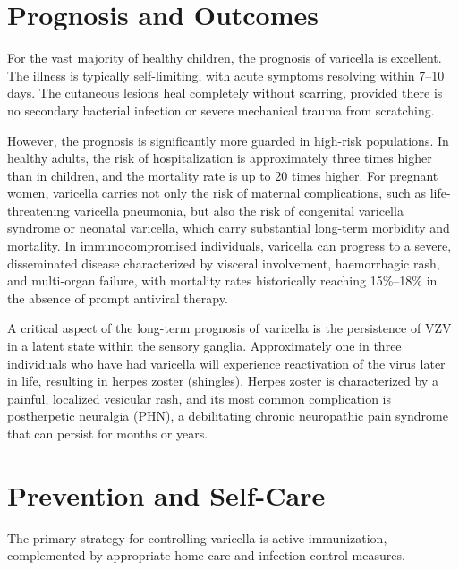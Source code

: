 \section*{Prognosis and Outcomes}
For the vast majority of healthy children, the prognosis of varicella is excellent. The illness is typically self-limiting, with acute symptoms resolving within 7--10 days. The cutaneous lesions heal completely without scarring, provided there is no secondary bacterial infection or severe mechanical trauma from scratching.

However, the prognosis is significantly more guarded in high-risk populations. In healthy adults, the risk of hospitalization is approximately three times higher than in children, and the mortality rate is up to 20 times higher. For pregnant women, varicella carries not only the risk of maternal complications, such as life-threatening varicella pneumonia, but also the risk of congenital varicella syndrome or neonatal varicella, which carry substantial long-term morbidity and mortality. In immunocompromised individuals, varicella can progress to a severe, disseminated disease characterized by visceral involvement, haemorrhagic rash, and multi-organ failure, with mortality rates historically reaching 15\%--18\% in the absence of prompt antiviral therapy.

A critical aspect of the long-term prognosis of varicella is the persistence of VZV in a latent state within the sensory ganglia. Approximately one in three individuals who have had varicella will experience reactivation of the virus later in life, resulting in herpes zoster (shingles). Herpes zoster is characterized by a painful, localized vesicular rash, and its most common complication is postherpetic neuralgia (PHN), a debilitating chronic neuropathic pain syndrome that can persist for months or years.

\section*{Prevention and Self-Care}
The primary strategy for controlling varicella is active immunization, complemented by appropriate home care and infection control measures.

